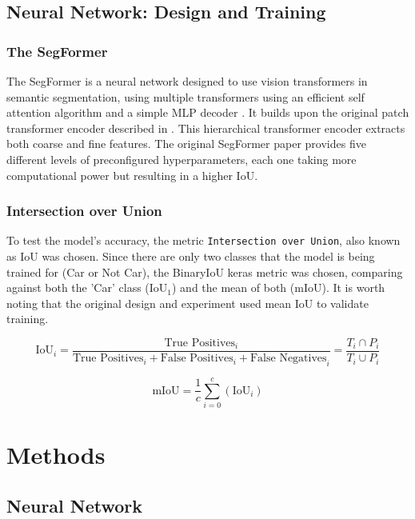 \documentclass[12pt]{article}
\begin{document}
    \subsection*{Neural Network: Design and Training}

    \subsubsection*{The SegFormer}

    The SegFormer is a neural network designed to use vision transformers in semantic segmentation, using multiple transformers using an efficient self attention algorithm and a simple MLP decoder \cite{DBLP:journals/corr/abs-2105-15203}. It builds upon the original patch transformer encoder described in \cite{DBLP:journals/corr/abs-2010-11929}. This hierarchical transformer encoder extracts both coarse and fine features. The original SegFormer paper provides five different levels of preconfigured hyperparameters, each one taking more computational power but resulting in a higher IoU.

    \subsubsection*{Intersection over Union}

    To test the model's accuracy, the metric \texttt{Intersection over Union}, also known as IoU was chosen. Since there are only two classes that the model is being trained for (Car or Not Car), the BinaryIoU keras metric was chosen, comparing against both the 'Car' class ($\text{IoU}_1$) and the mean of both (mIoU). It is worth noting that the original design and experiment used mean IoU to validate training.

    \[
        \text{IoU}_i = \frac{\text{True Positives}_i}{\text{True Positives}_i + \text {False Positives}_i + \text{False Negatives}_i} = \frac{T_i \cap P_i}{T _i\cup P_i}
    \]


    \[
        \text{mIoU} = \frac{1}{c}\sum_{i=0}^{c}(\text{IoU}_i)
    \]

    \section{Methods}

    \subsection*{Neural Network}
\end{document}
